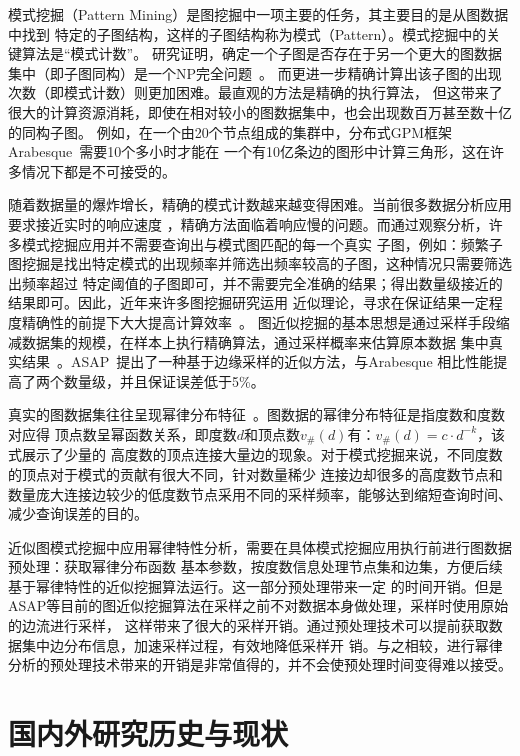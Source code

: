 \documentclass[master]{thesis-uestc}
\begin{document}
    模式挖掘（Pattern Mining）是图挖掘中一项主要的任务，其主要目的是从图数据中找到
特定的子图结构，这样的子图结构称为模式（Pattern）。模式挖掘中的关键算法是“模式计数”。
研究证明，确定一个子图是否存在于另一个更大的图数据集中（即子图同构）是一个NP完全问题~\cite{Complexity}。
而更进一步精确计算出该子图的出现次数（即模式计数）则更加困难。最直观的方法是精确的执行算法，
但这带来了很大的计算资源消耗，即使在相对较小的图数据集中，也会出现数百万甚至数十亿的同构子图。
例如，在一个由20个节点组成的集群中，分布式GPM框架Arabesque~\cite{Arabesque}需要10个多小时才能在
一个有10亿条边的图形中计算三角形，这在许多情况下都是不可接受的。

    随着数据量的爆炸增长，精确的模式计数越来越变得困难。当前很多数据分析应用要求接近实时的响应速度
，精确方法面临着响应慢的问题。而通过观察分析，许多模式挖掘应用并不需要查询出与模式图匹配的每一个真实
子图，例如：频繁子图挖掘是找出特定模式的出现频率并筛选出频率较高的子图，这种情况只需要筛选出频率超过
特定阈值的子图即可，并不需要完全准确的结果；得出数量级接近的结果即可。因此，近年来许多图挖掘研究运用
近似理论，寻求在保证结果一定程度精确性的前提下大大提高计算效率~\cite{BlinkDB,GRASS}。
图近似挖掘的基本思想是通过采样手段缩减数据集的规模，在样本上执行精确算法，通过采样概率来估算原本数据
集中真实结果~\cite{Congressional}。ASAP~\cite{ASAP}提出了一种基于边缘采样的近似方法，与Arabesque
相比性能提高了两个数量级，并且保证误差低于5\%。

    真实的图数据集往往呈现幂律分布特征~\cite{LargeScale}。图数据的幂律分布特征是指度数和度数对应得
顶点数呈幂函数关系，即度数$d$和顶点数$v_{\#}(d)$有：$v_{\#}(d)=c \cdot d^{-k}$，该式展示了少量的
高度数的顶点连接大量边的现象。对于模式挖掘来说，不同度数的顶点对于模式的贡献有很大不同，针对数量稀少
连接边却很多的高度数节点和数量庞大连接边较少的低度数节点采用不同的采样频率，能够达到缩短查询时间、
减少查询误差的目的。

    近似图模式挖掘中应用幂律特性分析，需要在具体模式挖掘应用执行前进行图数据预处理：获取幂律分布函数
基本参数，按度数信息处理节点集和边集，方便后续基于幂律特性的近似挖掘算法运行。这一部分预处理带来一定
的时间开销。但是ASAP等目前的图近似挖掘算法在采样之前不对数据本身做处理，采样时使用原始的边流进行采样，
这样带来了很大的采样开销。通过预处理技术可以提前获取数据集中边分布信息，加速采样过程，有效地降低采样开
销。与之相较，进行幂律分析的预处理技术带来的开销是非常值得的，并不会使预处理时间变得难以接受。



\section{国内外研究历史与现状}
\end{document}
